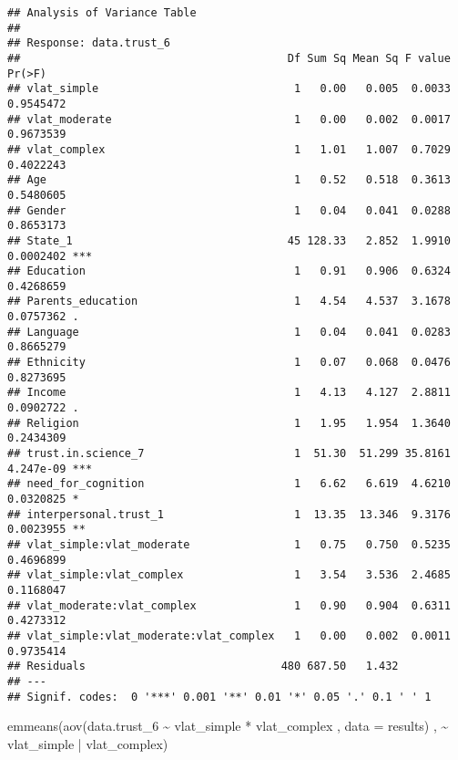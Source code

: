 \documentclass[
]{article}
\newenvironment{Shaded}{\begin{snugshade}}{\end{snugshade}}
\newcommand{\AttributeTok}[1]{\textcolor[rgb]{0.77,0.63,0.00}{#1}}
\newcommand{\FunctionTok}[1]{\textcolor[rgb]{0.00,0.00,0.00}{#1}}
\newcommand{\NormalTok}[1]{#1}
\newcommand{\SpecialCharTok}[1]{\textcolor[rgb]{0.00,0.00,0.00}{#1}}
\begin{document}
\begin{verbatim}
## Analysis of Variance Table
## 
## Response: data.trust_6
##                                         Df Sum Sq Mean Sq F value    Pr(>F)    
## vlat_simple                              1   0.00   0.005  0.0033 0.9545472    
## vlat_moderate                            1   0.00   0.002  0.0017 0.9673539    
## vlat_complex                             1   1.01   1.007  0.7029 0.4022243    
## Age                                      1   0.52   0.518  0.3613 0.5480605    
## Gender                                   1   0.04   0.041  0.0288 0.8653173    
## State_1                                 45 128.33   2.852  1.9910 0.0002402 ***
## Education                                1   0.91   0.906  0.6324 0.4268659    
## Parents_education                        1   4.54   4.537  3.1678 0.0757362 .  
## Language                                 1   0.04   0.041  0.0283 0.8665279    
## Ethnicity                                1   0.07   0.068  0.0476 0.8273695    
## Income                                   1   4.13   4.127  2.8811 0.0902722 .  
## Religion                                 1   1.95   1.954  1.3640 0.2434309    
## trust.in.science_7                       1  51.30  51.299 35.8161 4.247e-09 ***
## need_for_cognition                       1   6.62   6.619  4.6210 0.0320825 *  
## interpersonal.trust_1                    1  13.35  13.346  9.3176 0.0023955 ** 
## vlat_simple:vlat_moderate                1   0.75   0.750  0.5235 0.4696899    
## vlat_simple:vlat_complex                 1   3.54   3.536  2.4685 0.1168047    
## vlat_moderate:vlat_complex               1   0.90   0.904  0.6311 0.4273312    
## vlat_simple:vlat_moderate:vlat_complex   1   0.00   0.002  0.0011 0.9735414    
## Residuals                              480 687.50   1.432                      
## ---
## Signif. codes:  0 '***' 0.001 '**' 0.01 '*' 0.05 '.' 0.1 ' ' 1
\end{verbatim}

\begin{Shaded}
\begin{Highlighting}[]
\FunctionTok{emmeans}\NormalTok{(}\FunctionTok{aov}\NormalTok{(data.trust\_6 }\SpecialCharTok{\textasciitilde{}}\NormalTok{ vlat\_simple }\SpecialCharTok{*}\NormalTok{ vlat\_complex , }\AttributeTok{data =}\NormalTok{ results) , }\SpecialCharTok{\textasciitilde{}}\NormalTok{ vlat\_simple }\SpecialCharTok{|}\NormalTok{ vlat\_complex)}
\end{Highlighting}
\end{Shaded}
\end{document}
